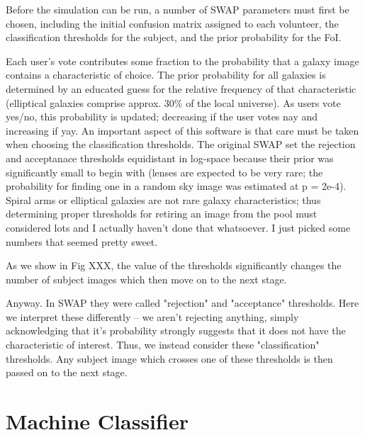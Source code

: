 \documentclass[twocolumn]{aastex6}
\begin{document}
Before the simulation can be run, a number of SWAP parameters must first be chosen,
including the initial confusion matrix assigned to each volunteer, the classification
thresholds for the subject, and the prior probability for the FoI. 


Each user's vote contributes some fraction to the probability that a galaxy image contains a characteristic of choice. The prior probability for all galaxies is determined by an educated guess for the relative frequency of that characteristic (elliptical galaxies comprise approx. 30\% of the local universe). As users vote yes/no, this probability is updated; decreasing if the user votes nay and increasing if yay. An important aspect of this software is that care must be taken when choosing the classification thresholds. The original SWAP set the rejection and acceptanace thresholds equidistant in log-space because their prior was significantly small to begin with (lenses are expected to be very rare; the probability for finding one in a random sky image was estimated at p = 2e-4).  Spiral arms or elliptical galaxies are not rare galaxy characteristics; thus determining proper thresholds for retiring an image from the pool must considered lots and I actually haven't done that whatsoever. I just picked some numbers that seemed pretty sweet. 

As we show in Fig XXX, the value of the thresholds significantly changes the number of subject images which then move on to the next stage. 

Anyway. In SWAP they were called "rejection" and "acceptance" thresholds. Here we interpret these differently  -- we aren't rejecting anything, simply acknowledging that it's probability strongly suggests that it does not have the characteristic of interest. Thus, we instead consider these "classification" thresholds. Any subject image which crosses one of these thresholds is then passed on to the next stage. 


\section{Machine Classifier} \label{sec:machine}
\end{document}
